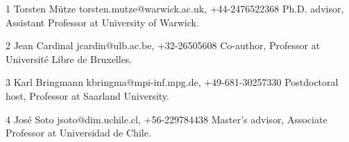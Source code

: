 

\begin{cvreferences}

  \cvreference
  {1} %
  {Torsten Mütze} %
  {torsten.mutze@warwick.ac.uk, +44-2476522368} %
  {Ph.D. advisor, Assistant Professor at University of Warwick.} %

  \cvreference
  {2} %
  {Jean Cardinal} %
  {jcardin@ulb.ac.be, +32-26505608} %
  {Co-author, Professor at Université Libre de Bruxelles.} %

  \cvreference
  {3} %
  {Karl Bringmann} %
  {kbringma@mpi-inf.mpg.de, +49-681-30257330} %
  {Postdoctoral host, Professor at Saarland University.} %

  \cvreference
  {4} %
  {José Soto} %
  {jsoto@dim.uchile.cl, +56-229784438} %
  {Master's advisor, Associate Professor at Universidad de Chile.} %
  \end{cvreferences}
  
  